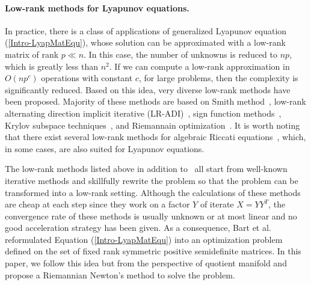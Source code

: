 \documentclass[11pt]{article}
\newcommand{\zwhcomm}[2]{{\sf\color{purple} #1}{\sf\color{blue} #2}}
\numberwithin{equation}{section}
\begin{document}
\paragraph{Low-rank methods for Lyapunov equations.} In practice, there is a class of applications of generalized Lyapunov equation (\ref{Intro-LyapMatEqu}), whose solution %
 can be approximated with a low-rank matrix of rank $p\ll n$. In this case, the number of unknowns is reduced to $np$, which is greatly less than $n^2$. If we can compute a low-rank approximation in $O(np^c)$ operations with constant $c$, for large problems, then the complexity is significantly reduced.
 Based on this idea, very diverse low-rank methods have been proposed. 
Majority of these methods are based on Smith method~\cite{Gugercin2003}, low-rank alternating direction implicit iterative (LR-ADI)~\cite{low-rank_2004,Benner2009OnTA,Benner2014ComputingRL,PDJ22}, sign function methods~\cite{Baur2006FactorizedSO,Baur2008LowRS}, Krylov subspace techniques~\cite{simoncini_new_2007,Druskin2011AdaptiveRK,Hamadi2021AMR}, and Riemannain optimization~\cite{Bart10}. It is worth noting that there exist several low-rank methods for algebraic Riccati equations~\cite{Mishra2013ARA,Benner2021ALS}, which, in some cases, are also suited for Lyapunov equations.
	
	
	 
		
		The low-rank methods listed above in addition to~\cite{Bart10,Mishra2013ARA} all start from well-known iterative methods and skillfully rewrite the problem so that the problem can be transformed into a low-rank setting. Although the calculations of these methods are cheap at each step since they work on a factor $Y$ of iterate $X=YY^T$, the convergence rate of these methods is usually unknown or at most linear and no good acceleration strategy has been given. As a consequence, Bart et al. \cite{Bart10} reformulated Equation (\ref{Intro-LyapMatEqu}) into an optimization problem defined on the set of fixed rank symmetric positive semidefinite matrices. %
  In this paper, we follow this idea but from the perspective of quotient manifold and %
  propose a
  Riemannian Newton's method to solve %
  the
  problem. 
\end{document}
